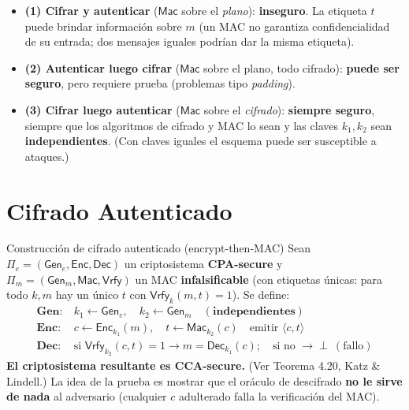\documentclass[11pt,a4paper]{article}
\newcommand{\Mac}{\mathsf{Mac}}
\newcommand{\Vrfy}{\mathsf{Vrfy}}
\newcommand{\Gen}{\mathsf{Gen}}
\newcommand{\Enc}{\mathsf{Enc}}
\newcommand{\Dec}{\mathsf{Dec}}
\begin{document}
\begin{itemize}[leftmargin=1.4em,itemsep=2pt]
  \item \textbf{(1) Cifrar y autenticar} ($\Mac$ sobre el \emph{plano}): \textcolor{attackRed}{
        \textbf{inseguro}}. La etiqueta $t$ puede brindar información sobre $m$ (un MAC no
        garantiza confidencialidad de su entrada; dos mensajes iguales podrían dar la misma
        etiqueta).
  \item \textbf{(2) Autenticar luego cifrar} ($\Mac$ sobre el plano, todo cifrado):
        \textbf{puede ser seguro}, pero requiere prueba (problemas tipo \emph{padding}).
  \item \textbf{(3) Cifrar luego autenticar} ($\Mac$ sobre el \emph{cifrado}): \textcolor{
        practGreen}{\textbf{siempre seguro}}, siempre que los algoritmos de cifrado y MAC lo
        sean y las claves $k_1,k_2$ sean \textbf{independientes}. (Con claves iguales el
        esquema puede ser susceptible a ataques.)
\end{itemize}

\section{Cifrado Autenticado}

\begin{defbox}{Construcción de cifrado autenticado (encrypt-then-MAC)}
Sean $\Pi_e=(\Gen_e,\Enc,\Dec)$ un criptosistema \textbf{CPA-secure} y
$\Pi_m=(\Gen_m,\Mac,\Vrfy)$ un MAC \textbf{infalsificable} (con etiquetas únicas: para todo
$k,m$ hay un único $t$ con $\Vrfy_k(m,t)=1$). Se define:
\begin{align*}
  \textbf{Gen:}\ & k_1\leftarrow\Gen_e,\quad k_2\leftarrow\Gen_m \quad(\textbf{independientes})\\
  \textbf{Enc:}\ & c\leftarrow\Enc_{k_1}(m),\quad t\leftarrow\Mac_{k_2}(c) \quad\text{emitir }\langle c,t\rangle\\
  \textbf{Dec:}\ & \text{si } \Vrfy_{k_2}(c,t)=1 \to m=\Dec_{k_1}(c);\quad \text{si no } \to \perp\ (\text{fallo})
\end{align*}
\textbf{El criptosistema resultante es CCA-secure.} (Ver Teorema 4.20, Katz \& Lindell.) La
idea de la prueba es mostrar que el oráculo de descifrado \textbf{no le sirve de nada} al
adversario (cualquier $c$ adulterado falla la verificación del MAC).
\end{defbox}
\end{document}

